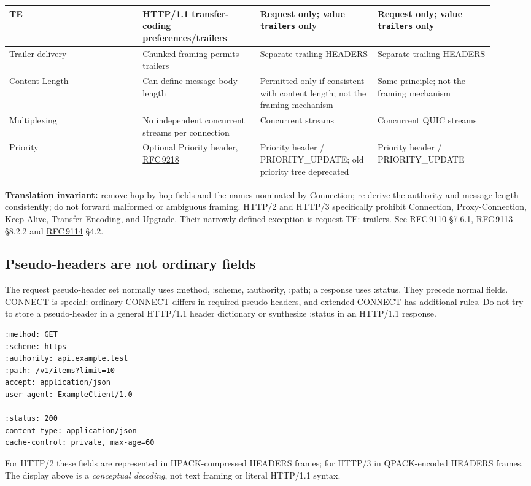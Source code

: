 \documentclass[10pt,letterpaper,oneside]{article}
\newcommand{\field}[1]{{\ttfamily\small\color{Deep}#1}}
\newcommand{\rf}[1]{\href{https://www.rfc-editor.org/rfc/rfc#1.html}{RFC\,#1}}
\begin{document}
\begin{longtable}{>{\RaggedRight\arraybackslash}p{0.250\linewidth}>{\RaggedRight\arraybackslash}p{0.223\linewidth}>{\RaggedRight\arraybackslash}p{0.223\linewidth}>{\RaggedRight\arraybackslash}p{0.223\linewidth}}
TE & HTTP/1.1 transfer-coding preferences/trailers & Request only; value \texttt{trailers} only & Request only; value \texttt{trailers} only\\\midrule
Trailer delivery & Chunked framing permits trailers & Separate trailing HEADERS & Separate trailing HEADERS\\\midrule
Content-Length & Can define message body length & Permitted only if consistent with content length; not the framing mechanism & Same principle; not the framing mechanism\\\midrule
Multiplexing & No independent concurrent streams per connection & Concurrent streams & Concurrent QUIC streams\\\midrule
Priority & Optional \field{Priority} header, \rf{9218} & Priority header / PRIORITY\_UPDATE; old priority tree deprecated & Priority header / PRIORITY\_UPDATE\\\midrule
\bottomrule
\end{longtable}
\normalsize
\begin{warnbox}
\textbf{Translation invariant:} remove hop-by-hop fields and the names nominated by \field{Connection}; re-derive the authority and message length consistently; do not forward malformed or ambiguous framing. HTTP/2 and HTTP/3 specifically prohibit \field{Connection}, \field{Proxy-Connection}, \field{Keep-Alive}, \field{Transfer-Encoding}, and \field{Upgrade}. Their narrowly defined exception is request \field{TE: trailers}. See \rf{9110} \S7.6.1, \rf{9113} \S8.2.2 and \rf{9114} \S4.2.
\end{warnbox}
\subsection{Pseudo-headers are not ordinary fields}
The request pseudo-header set normally uses \field{:method}, \field{:scheme}, \field{:authority}, \field{:path}; a response uses \field{:status}. They precede normal fields. CONNECT is special: ordinary CONNECT differs in required pseudo-headers, and extended CONNECT has additional rules. Do not try to store a pseudo-header in a general HTTP/1.1 header dictionary or synthesize \field{:status} in an HTTP/1.1 response.

\begin{lstlisting}[caption={HTTP/2 or HTTP/3 logical field sections; not literal wire text}]
:method: GET
:scheme: https
:authority: api.example.test
:path: /v1/items?limit=10
accept: application/json
user-agent: ExampleClient/1.0

:status: 200
content-type: application/json
cache-control: private, max-age=60
\end{lstlisting}
For HTTP/2 these fields are represented in HPACK-compressed HEADERS frames; for HTTP/3 in QPACK-encoded HEADERS frames. The display above is a \emph{conceptual decoding}, not text framing or literal HTTP/1.1 syntax.
\end{document}
